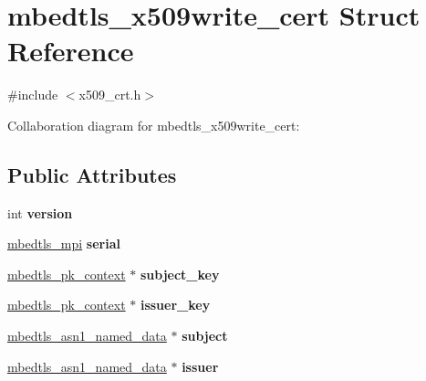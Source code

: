 \hypertarget{structmbedtls__x509write__cert}{}\section{mbedtls\+\_\+x509write\+\_\+cert Struct Reference}
\label{structmbedtls__x509write__cert}


{\ttfamily \#include $<$x509\+\_\+crt.\+h$>$}



Collaboration diagram for mbedtls\+\_\+x509write\+\_\+cert\+:
\subsection*{Public Attributes}
\begin{DoxyCompactItemize}
\item 
\mbox{\label{structmbedtls__x509write__cert_a9efd79e9e5e9228c957728db5d03a459}} 
int {\bfseries version}
\item 
\mbox{\label{structmbedtls__x509write__cert_ab7ff135f8e06151a37ad6f1a10ffac53}} 
\mbox{\hyperlink{structmbedtls__mpi}{mbedtls\+\_\+mpi}} {\bfseries serial}
\item 
\mbox{\label{structmbedtls__x509write__cert_ac340701cdf2c579031ee2a50116caccb}} 
\mbox{\hyperlink{structmbedtls__pk__context}{mbedtls\+\_\+pk\+\_\+context}} $\ast$ {\bfseries subject\+\_\+key}
\item 
\mbox{\label{structmbedtls__x509write__cert_a50ab1cded78af00e04dc3541f8855f6e}} 
\mbox{\hyperlink{structmbedtls__pk__context}{mbedtls\+\_\+pk\+\_\+context}} $\ast$ {\bfseries issuer\+\_\+key}
\item 
\mbox{\label{structmbedtls__x509write__cert_a952c4123df451d97b328cc5e4064b4e2}} 
\mbox{\hyperlink{structmbedtls__asn1__named__data}{mbedtls\+\_\+asn1\+\_\+named\+\_\+data}} $\ast$ {\bfseries subject}
\item 
\mbox{\label{structmbedtls__x509write__cert_a6c66901676851921daa39a7cd194b39b}} 
\mbox{\hyperlink{structmbedtls__asn1__named__data}{mbedtls\+\_\+asn1\+\_\+named\+\_\+data}} $\ast$ {\bfseries issuer}

\end{DoxyCompactItemize}
